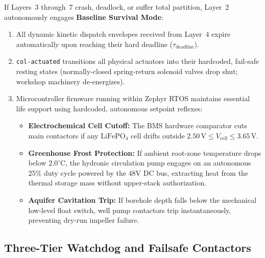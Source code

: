 If Layers~3 through~7 crash, deadlock, or suffer total partition, Layer~2 autonomously engages \textbf{Baseline Survival Mode}:
\begin{enumerate}
    \item All dynamic kinetic dispatch envelopes received from Layer~4 expire automatically upon reaching their hard deadline ($\tau_{\mathrm{deadline}}$).
    \item \texttt{col-actuated} transitions all physical actuators into their hardcoded, fail-safe resting states (normally-closed spring-return solenoid valves drop shut; workshop machinery de-energizes).
    \item Microcontroller firmware running within Zephyr RTOS maintains essential life support using hardcoded, autonomous setpoint reflexes:
    \begin{itemize}
        \item \textbf{Electrochemical Cell Cutoff:} The BMS hardware comparator cuts main contactors if any $\mathrm{LiFePO}_4$ cell drifts outside $2.50\,\mathrm{V} \le V_{\mathrm{cell}} \le 3.65\,\mathrm{V}$.
        \item \textbf{Greenhouse Frost Protection:} If ambient root-zone temperature drops below $2.0^\circ\mathrm{C}$, the hydronic circulation pump engages on an autonomous $25\%$ duty cycle powered by the 48V DC bus, extracting heat from the thermal storage mass without upper-stack authorization.
        \item \textbf{Aquifer Cavitation Trip:} If borehole depth falls below the mechanical low-level float switch, well pump contactors trip instantaneously, preventing dry-run impeller failure.
    \end{itemize}
\end{enumerate}

\subsection{Three-Tier Watchdog and Failsafe Contactors}

